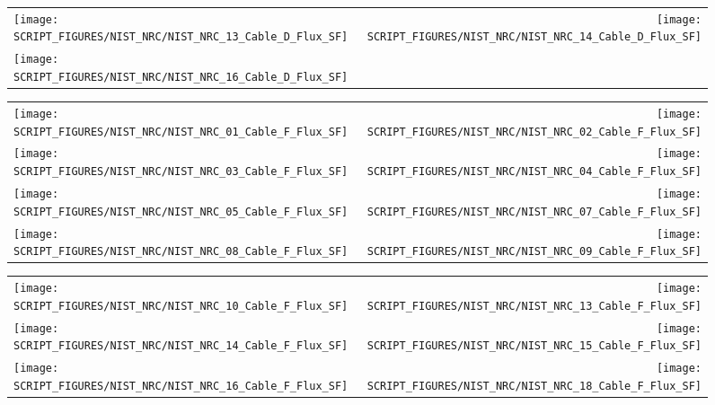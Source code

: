 \begin{figure}[p]
\begin{tabular*}{\textwidth}{l@{\extracolsep{\fill}}r}
\texttt{[image: SCRIPT\_FIGURES/NIST\_NRC/NIST\_NRC\_13\_Cable\_D\_Flux\_SF]} &
\texttt{[image: SCRIPT\_FIGURES/NIST\_NRC/NIST\_NRC\_14\_Cable\_D\_Flux\_SF]} \\
\texttt{[image: SCRIPT\_FIGURES/NIST\_NRC/NIST\_NRC\_16\_Cable\_D\_Flux\_SF]}
\end{tabular*}
\end{figure}

\begin{figure}[p]
\begin{tabular*}{\textwidth}{l@{\extracolsep{\fill}}r}
\texttt{[image: SCRIPT\_FIGURES/NIST\_NRC/NIST\_NRC\_01\_Cable\_F\_Flux\_SF]} &
\texttt{[image: SCRIPT\_FIGURES/NIST\_NRC/NIST\_NRC\_02\_Cable\_F\_Flux\_SF]} \\
\texttt{[image: SCRIPT\_FIGURES/NIST\_NRC/NIST\_NRC\_03\_Cable\_F\_Flux\_SF]} &
\texttt{[image: SCRIPT\_FIGURES/NIST\_NRC/NIST\_NRC\_04\_Cable\_F\_Flux\_SF]} \\
\texttt{[image: SCRIPT\_FIGURES/NIST\_NRC/NIST\_NRC\_05\_Cable\_F\_Flux\_SF]} &
\texttt{[image: SCRIPT\_FIGURES/NIST\_NRC/NIST\_NRC\_07\_Cable\_F\_Flux\_SF]} \\
\texttt{[image: SCRIPT\_FIGURES/NIST\_NRC/NIST\_NRC\_08\_Cable\_F\_Flux\_SF]} &
\texttt{[image: SCRIPT\_FIGURES/NIST\_NRC/NIST\_NRC\_09\_Cable\_F\_Flux\_SF]}
\end{tabular*}
\end{figure}

\begin{figure}[p]
\begin{tabular*}{\textwidth}{l@{\extracolsep{\fill}}r}
\texttt{[image: SCRIPT\_FIGURES/NIST\_NRC/NIST\_NRC\_10\_Cable\_F\_Flux\_SF]} &
\texttt{[image: SCRIPT\_FIGURES/NIST\_NRC/NIST\_NRC\_13\_Cable\_F\_Flux\_SF]} \\
\texttt{[image: SCRIPT\_FIGURES/NIST\_NRC/NIST\_NRC\_14\_Cable\_F\_Flux\_SF]} &
\texttt{[image: SCRIPT\_FIGURES/NIST\_NRC/NIST\_NRC\_15\_Cable\_F\_Flux\_SF]} \\
\texttt{[image: SCRIPT\_FIGURES/NIST\_NRC/NIST\_NRC\_16\_Cable\_F\_Flux\_SF]} &
\texttt{[image: SCRIPT\_FIGURES/NIST\_NRC/NIST\_NRC\_18\_Cable\_F\_Flux\_SF]}
\end{tabular*}
\end{figure}

